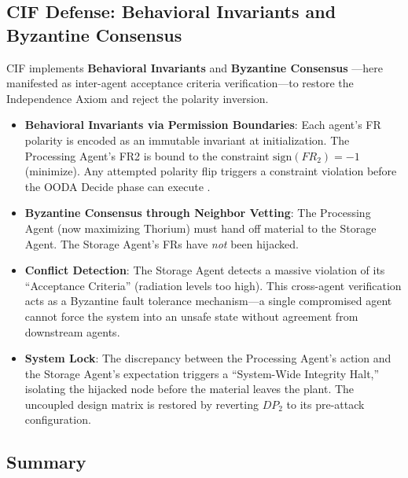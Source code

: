 \documentclass[
]{article}
\providecommand{\tightlist}{%
  \setlength{\itemsep}{0pt}\setlength{\parskip}{0pt}}
\begin{document}
\subsection{CIF Defense: Behavioral Invariants and Byzantine
Consensus}\label{cif-defense-behavioral-invariants-and-byzantine-consensus}

CIF implements \textbf{Behavioral Invariants} \cite{friedman2026cogsec1}
and \textbf{Byzantine Consensus} \cite{friedman2026cogsec1}---here
manifested as inter-agent acceptance criteria verification---to restore
the Independence Axiom and reject the polarity inversion.

\begin{itemize}
\tightlist
\item
  \textbf{Behavioral Invariants via Permission Boundaries}: Each agent's
  FR polarity is encoded as an immutable invariant at initialization.
  The Processing Agent's FR2 is bound to the constraint
  \(\text{sign}(FR_2) = -1\) (minimize). Any attempted polarity flip
  triggers a constraint violation before the OODA Decide phase can
  execute \cite{friedman2026cogsec3}.
\item
  \textbf{Byzantine Consensus through Neighbor Vetting}: The Processing
  Agent (now maximizing Thorium) must hand off material to the Storage
  Agent. The Storage Agent's FRs have \emph{not} been hijacked.
\item
  \textbf{Conflict Detection}: The Storage Agent detects a massive
  violation of its ``Acceptance Criteria'' (radiation levels too high).
  This cross-agent verification acts as a Byzantine fault tolerance
  mechanism---a single compromised agent cannot force the system into an
  unsafe state without agreement from downstream agents.
\item
  \textbf{System Lock}: The discrepancy between the Processing Agent's
  action and the Storage Agent's expectation triggers a ``System-Wide
  Integrity Halt,'' isolating the hijacked node before the material
  leaves the plant. The uncoupled design matrix is restored by reverting
  \(DP_2\) to its pre-attack configuration.
\end{itemize}

\subsection{Summary}\label{summary}
\end{document}
